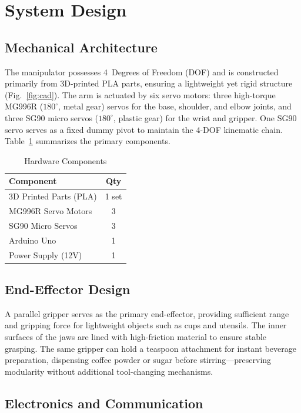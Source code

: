 \documentclass[conference]{IEEEtran}
\begin{document}
\section{System Design}

\subsection{Mechanical Architecture}

The manipulator possesses 4~Degrees of Freedom (DOF) and is constructed primarily from 3D-printed PLA parts, ensuring a lightweight yet rigid structure (Fig.~\ref{fig:cad}). The arm is actuated by six servo motors: three high-torque MG996R ($180^{\circ}$, metal gear) servos for the base, shoulder, and elbow joints, and three SG90 micro servos ($180^{\circ}$, plastic gear) for the wrist and gripper. One SG90 servo serves as a fixed dummy pivot to maintain the 4-DOF kinematic chain. Table~\ref{tab:hardware} summarizes the primary components.

\begin{table}[H]
\centering
\caption{Hardware Components}
\label{tab:hardware}
\begin{tabular}{lc}
\toprule
\textbf{Component} & \textbf{Qty} \\
\midrule
3D Printed Parts (PLA) & 1 set \\
MG996R Servo Motors & 3 \\
SG90 Micro Servos & 3 \\
Arduino Uno & 1 \\
Power Supply (12V) & 1 \\
\bottomrule
\end{tabular}
\end{table}

\subsection{End-Effector Design}

A parallel gripper serves as the primary end-effector, providing sufficient range and gripping force for lightweight objects such as cups and utensils. The inner surfaces of the jaws are lined with high-friction material to ensure stable grasping. The same gripper can hold a teaspoon attachment for instant beverage preparation, dispensing coffee powder or sugar before stirring---preserving modularity without additional tool-changing mechanisms.

\subsection{Electronics and Communication}
\end{document}
